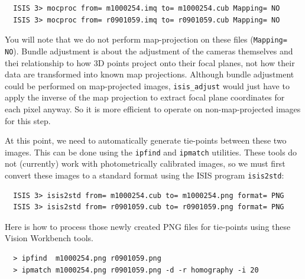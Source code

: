 \begin{verbatim}
  ISIS 3> mocproc from= m1000254.imq to= m1000254.cub Mapping= NO
  ISIS 3> mocproc from= r0901059.imq to= r0901059.cub Mapping= NO
\end{verbatim}

You will note that we do not perform map-projection on these files
(\texttt{Mapping= NO}).  Bundle adjustment is about the adjustment
of the cameras themselves and thei relationship to how 3D points
project onto their focal planes, not how their data are transformed
into known map projections.  Although bundle adjustment could be 
performed on map-projected images, \texttt{isis\_adjust} would just
have to apply the inverse of the map projection to extract focal plane
coordinates for each pixel anyway.  So it is more efficient to operate
on non-map-projected images for this step.

At this point, we need to automatically generate tie-points between
these two images.  This can be done using the \texttt{ipfind} and
\texttt{ipmatch} utilities.  These tools do not (currently) work
with photometrically calibrated images, so we must first convert
these images to a standard format using the \ac{ISIS} program
\texttt{isis2std}:

\begin{verbatim}
  ISIS 3> isis2std from= m1000254.cub to= m1000254.png format= PNG
  ISIS 3> isis2std from= r0901059.cub to= r0901059.png format= PNG
\end{verbatim}

Here is how to process those newly created PNG files for tie-points
using these Vision Workbench tools.

\begin{verbatim}
  > ipfind  m1000254.png r0901059.png
  > ipmatch m1000254.png r0901059.png -d -r homography -i 20
\end{verbatim}

\begin{center}
\end{center}

